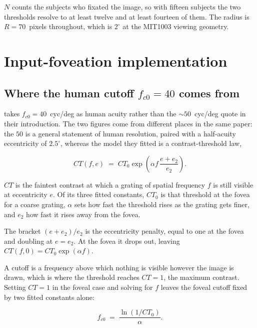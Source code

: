$N$ counts the subjects who fixated the image, so with fifteen subjects the two thresholds resolve to
at least twelve and at least fourteen of them. The radius is $R = 70$~pixels throughout, which is
$2^\circ$ at the MIT1003 viewing geometry.

\section{Input-foveation implementation}
\label{app:foveation}

\subsection*{Where the human cutoff \texorpdfstring{$f_{c0} = 40$}{fc0 = 40} comes from}

 takes $f_{c0} = 40$~cyc/deg as human acuity rather than the ${\sim}50$~cyc/deg
\citet{geislerperry1998} quote in their introduction. The two figures come from different places in the
same paper: the $50$ is a general statement of human resolution, paired with a half-acuity eccentricity of
$2.5^\circ$, whereas the model they fitted is a contrast-threshold law,

\begin{equation}
  CT(f, e) \;=\; CT_0 \exp\!\left(\alpha f \, \frac{e + e_2}{e_2}\right).
  \label{eq:gp-contrast}
\end{equation}

$CT$ is the faintest contrast at which a grating of spatial frequency $f$ is still visible at
eccentricity $e$. Of its three fitted constants, $CT_0$ is that threshold at the fovea for a coarse
grating, $\alpha$ sets how fast the threshold rises as the grating gets finer, and $e_2$ how fast it
rises away from the fovea.

The bracket $(e + e_2)/e_2$ is the eccentricity penalty, equal to one at the fovea and doubling at
$e = e_2$. At the fovea it drops out, leaving $CT(f, 0) = CT_0 \exp(\alpha f)$.

A cutoff is a frequency above which nothing is visible however the image is drawn, which is where the
threshold reaches $CT = 1$, the maximum contrast. Setting $CT = 1$ in the foveal case and solving for
$f$ leaves the foveal cutoff fixed by two fitted constants alone:

\begin{equation}
  f_{c0} \;=\; \frac{\ln(1/CT_0)}{\alpha}.
  \label{eq:fc0-derivation}
\end{equation}

